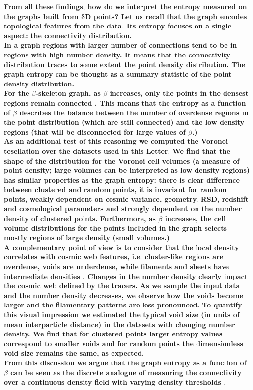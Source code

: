 \documentclass[fleqn,usenatbib]{mnras}
\begin{document}
\textbf{From all these findings, how do we interpret the entropy measured on the graphs built from 3D points?
Let us recall that the graph encodes topological
features from the data.
  Its entropy focuses on a single aspect: the connectivity distribution.\\
\indent 
In a graph regions with larger number of connections tend to be in regions with high number density.
It means that the connectivity distribution traces to some extent the point density distribution.
  The graph entropy can be thought as a summary
  statistic of the point density distribution.\\
\indent
  For the $\beta$-skeleton graph, as $\beta$ increases, only the points in the densest regions remain
  connected \citep{2019MNRAS.485.5276F}.
  This means that the entropy as a function of $\beta$ describes the
  balance between the number of 
  overdense regions in the point distribution (which are still
  connected) and the low density regions (that will be disconnected
  for large values of $\beta$.)\\
\indent
As an additional test of this reasoning we computed the Voronoi tesellation over the datasets used in this Letter. 
We find that the shape of the distribution for the Voronoi cell volumes (a measure
of point density; large volumes can be interpreted as low density regions) 
has similar properties as the graph entropy: there is clear difference between clustered and random points, it is invariant for random points,
weakly dependent on cosmic variance, geometry, RSD, redshift and
cosmological parameters and strongly dependent on the number density
of clustered points.
Furthermore, as $\beta$ increases, the cell volume distributions for the points included in
the graph selects mostly regions of large density (small volumes.)\\
\indent
A complementary point of view is to consider that the local density
correlates with cosmic web features,
i.e. cluster-like regions are overdense, voids are underdense, while filaments and sheets have
 intermediate densities \citep{2018MNRAS.473.1195L}. 
 Changes in the number density clearly impact the cosmic web defined by the tracers.
  As we sample the input data and the number density decreases, we observe how the voids become
  larger and the filamentary patterns are less pronounced.  
  To quantify this visual impression we estimated the typical void size
  (in units of mean interparticle distance)
  in the datasets with changing number density.  
We find that for clustered points larger entropy values correspond to smaller voids and for random points the dimensionless void size remains the same, as expected.\\
\indent
From this discussion we argue that the graph entropy as a function of $\beta$ can be seen as the discrete analogue of
  measuring the connectivity 
  over a continuous density field with varying density thresholds \citep{2013JKAS...46..125P}.}
\end{document}
